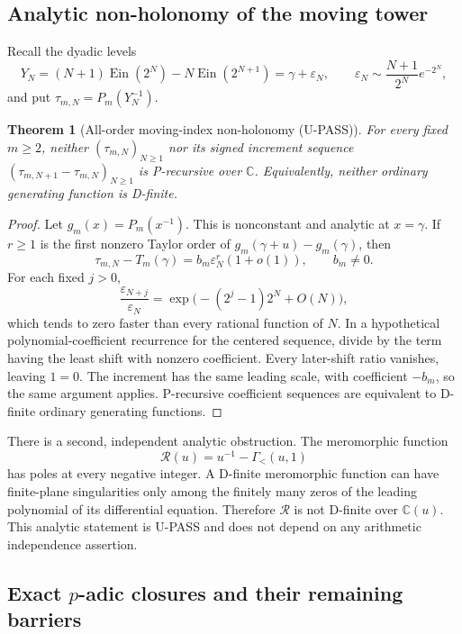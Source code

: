 \documentclass[11pt]{article}
\theoremstyle{keio}
\newtheorem{theorem}{Theorem}[section]
\theoremstyle{definition}
\theoremstyle{remark}
\newcommand{\C}{\mathbb C}
\newcommand{\Ein}{\operatorname{Ein}}
\newcommand{\UPASS}{\textcolor{keiogreen}{\textsf{U-PASS}}}
\begin{document}
\subsection{Analytic non-holonomy of the moving tower}

Recall the dyadic levels
\[
 Y_N=(N+1)\Ein(2^N)-N\Ein(2^{N+1})
 =\gamma+\varepsilon_N,
 \qquad
 \varepsilon_N\sim\frac{N+1}{2^N}e^{-2^N},
\]
and put \(\tau_{m,N}=P_m(Y_N^{-1})\).

\begin{theorem}[All-order moving-index non-holonomy (\UPASS)]
\label{thm:transfer-nonholonomy}
For every fixed \(m\ge2\), neither \((\tau_{m,N})_{N\ge1}\) nor its
signed increment sequence
\((\tau_{m,N+1}-\tau_{m,N})_{N\ge1}\) is P-recursive over \(\C\).
Equivalently, neither ordinary generating function is D-finite.
\end{theorem}

\begin{proof}
Let \(g_m(x)=P_m(x^{-1})\).  This is nonconstant and analytic at
\(x=\gamma\).  If \(r\ge1\) is the first nonzero Taylor order of
\(g_m(\gamma+u)-g_m(\gamma)\), then
\[
 \tau_{m,N}-T_m(\gamma)=b_m\varepsilon_N^r(1+o(1)),
 \qquad b_m\ne0.
\]
For each fixed \(j>0\),
\[
 \frac{\varepsilon_{N+j}}{\varepsilon_N}
 =\exp\bigl(-(2^j-1)2^N+O(N)\bigr),
\]
which tends to zero faster than every rational function of \(N\).
In a hypothetical polynomial-coefficient recurrence for the centered
sequence, divide by the term having the least shift with nonzero
coefficient.  Every later-shift ratio vanishes, leaving \(1=0\).  The
increment has the same leading scale, with coefficient \(-b_m\), so the
same argument applies.  P-recursive coefficient sequences are equivalent
to D-finite ordinary generating functions.
\end{proof}

There is a second, independent analytic obstruction.  The meromorphic
function
\[
 \mathscr R(u)=u^{-1}-\Gamma_{<}(u,1)
\]
has poles at every negative integer.  A D-finite meromorphic function can
have finite-plane singularities only among the finitely many zeros of the
leading polynomial of its differential equation.  Therefore
\(\mathscr R\) is not D-finite over \(\C(u)\).  This analytic statement is
\UPASS{} and does not depend on any arithmetic independence assertion.

\subsection{\texorpdfstring{Exact \(p\)-adic closures and their remaining
barriers}{Exact p-adic closures and their remaining barriers}}
\end{document}
